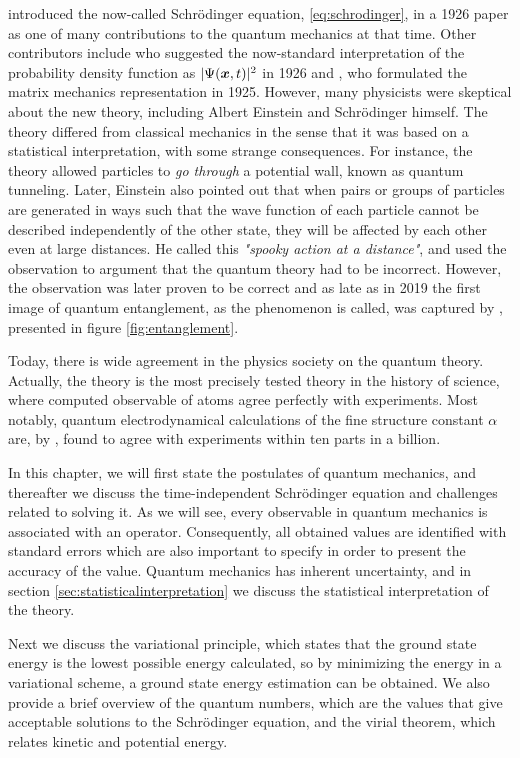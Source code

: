 \citet{schrodinger_undulatory_1926} introduced the now-called Schrödinger equation, \eqref{eq:schrodinger}, in a 1926 paper as one of many contributions to the quantum mechanics at that time. Other contributors include \citet{born_zur_1926} who suggested the now-standard interpretation of the probability density function as $|\Psi(\boldsymbol{{x}},t)|^2$ in 1926 and \citet{heisenberg_uber_1925}, who formulated the matrix mechanics representation in 1925. However, many physicists were skeptical about the new theory, including Albert Einstein and Schrödinger himself. The theory differed from classical mechanics in the sense that it was based on a statistical interpretation, with some strange consequences. For instance, the theory allowed particles to \textit{go through} a potential wall, known as quantum tunneling. Later, Einstein \supercite{einstein_can_1935} also pointed out that when pairs or groups of particles are generated in ways such that the wave function of each particle cannot be described independently of the other state, they will be affected by each other even at large distances. He called this \textit{"spooky action at a distance"}, and used the observation to argument that the quantum theory had to be incorrect. However, the observation was later proven to be correct and as late as in 2019 the first image of quantum entanglement, as the phenomenon is called, was captured by \citet{moreau_imaging_2019}, presented in figure \eqref{fig:entanglement}.

Today, there is wide agreement in the physics society on the quantum theory. Actually, the theory is the most precisely tested theory in the history of science, where computed observable of atoms agree perfectly with experiments. Most notably, quantum electrodynamical calculations of the fine structure constant $\alpha$ are, by \citet{odom_new_2006}, found to agree with experiments within ten parts in a billion.

In this chapter, we will first state the postulates of quantum mechanics, and thereafter we discuss the time-independent Schrödinger equation and challenges related to solving it. As we will see, every observable in quantum mechanics is associated with an operator. Consequently, all obtained values are identified with standard errors which are also important to specify in order to present the accuracy of the value. Quantum mechanics has inherent uncertainty, and in section \ref{sec:statisticalinterpretation} we discuss the statistical interpretation of the theory. 

Next we discuss the variational principle, which states that the ground state energy is the lowest possible energy calculated, so by minimizing the energy in a variational scheme, a ground state energy estimation can be obtained. We also provide a brief overview of the quantum numbers, which are the values that give acceptable solutions to the Schrödinger equation, and the virial theorem, which relates kinetic and potential energy. 

